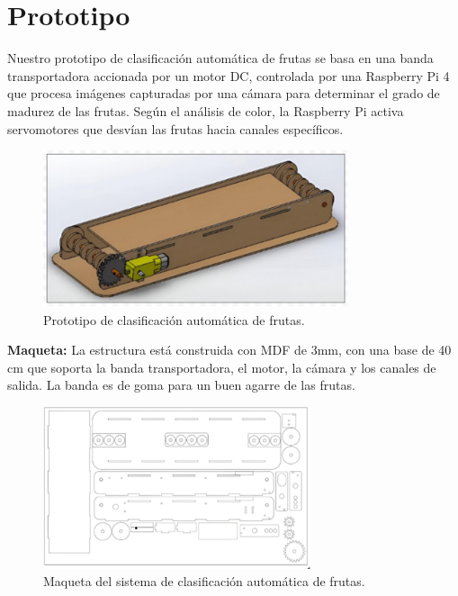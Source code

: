 \section{Prototipo}

Nuestro prototipo de clasificación automática de frutas se basa en una banda transportadora accionada por un motor DC, controlada por una Raspberry Pi 4 que procesa imágenes capturadas por una cámara para determinar el grado de madurez de las frutas. Según el análisis de color, la Raspberry Pi activa servomotores que desvían las frutas hacia canales específicos.

\begin{figure}[H]
    \centering
    \includegraphics[width=0.8\textwidth]{./assets/prototipo.png}
    \caption{Prototipo de clasificación automática de frutas.}
    \label{fig:prototipo}
\end{figure}

\textbf{Maqueta:} La estructura está construida con MDF de 3mm, con una base de 40 cm que soporta la banda transportadora, el motor, la cámara y los canales de salida. La banda es de goma para un buen agarre de las frutas.

\begin{figure}[H]
    \centering
    \includegraphics[width=0.7\textwidth]{./assets/maqueta.png}
    \caption{Maqueta del sistema de clasificación automática de frutas.}
    \label{fig:maqueta}
\end{figure}

